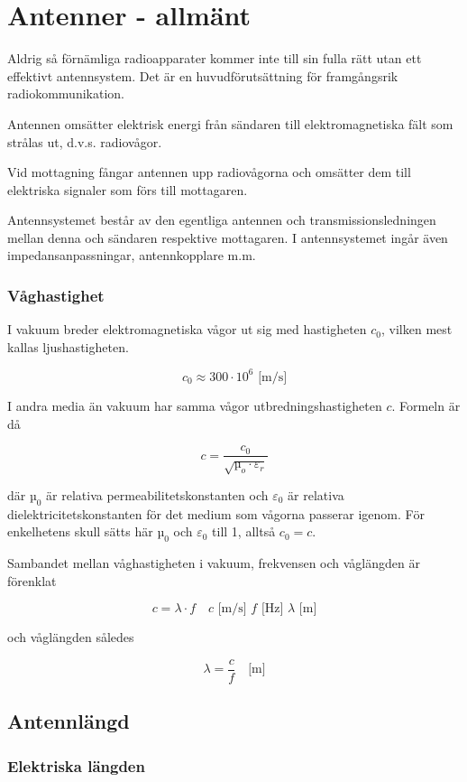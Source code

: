 \section{Antenner - allmänt}

Aldrig så förnämliga radioapparater kommer inte till sin fulla rätt
utan ett effektivt antennsystem. Det är en huvudförutsättning för
framgångsrik radiokommunikation.

Antennen omsätter elektrisk energi från sändaren till
elektromagnetiska fält som strålas ut, d.v.s. radiovågor.

Vid mottagning fångar antennen upp radiovågorna och omsätter dem till
elektriska signaler som förs till mottagaren.

Antennsystemet består av den egentliga antennen och
transmissionsledningen mellan denna och sändaren respektive
mottagaren. I antennsystemet ingår även impedansanpassningar,
antennkopplare m.m.


\subsubsection{Våghastighet}

I vakuum breder elektromagnetiska vågor ut sig med hastigheten
\(c_0\), vilken mest kallas ljushastigheten.

\[c_0 \approx 300 \cdot 10^6 \text{ [m/s]}\]

I andra media än vakuum har samma vågor utbredningshastigheten
\(c\). Formeln är då

\[c = \frac{c_0}{\sqrt{µ_o \cdot \varepsilon_r}}\]

där \(µ_0\) är relativa permeabilitetskonstanten och \(\varepsilon_0\)
är relativa dielektricitetskonstanten för det medium som vågorna
passerar igenom.  För enkelhetens skull sätts här \(µ_0\) och
\(\varepsilon_0\) till 1, alltså \(c_0 = c\).

Sambandet mellan våghastigheten i vakuum, frekvensen och våglängden är förenklat

\[ c = \lambda \cdot f \quad c\text{ [m/s] }f\text{ [Hz] }\lambda\text{ [m]}\]

och våglängden således

\[ \lambda = \frac{c}{f} \quad \text{[m]} \]

\subsection{Antennlängd}

\subsubsection{Elektriska längden}

